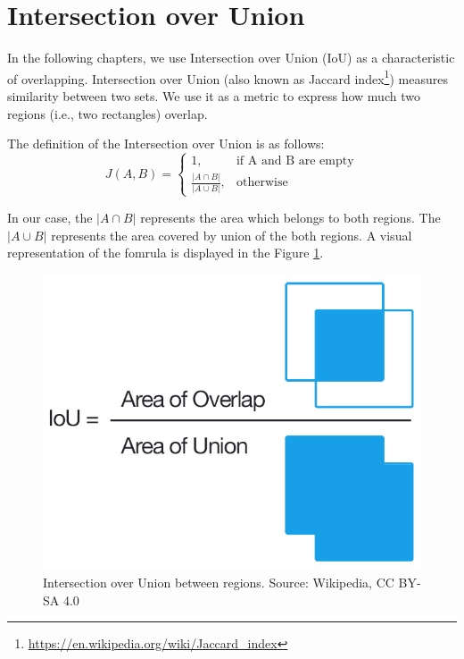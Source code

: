 \section{Intersection over Union}

In the following chapters, we use Intersection over Union (IoU) as a characteristic of overlapping. Intersection over Union (also known as Jaccard index\footnote{\href{https://en.wikipedia.org/wiki/Jaccard_index}{https://en.wikipedia.org/wiki/Jaccard\_index}}) measures similarity between two sets. We use it as a metric to express how much two regions (i.e., two rectangles) overlap. 

The definition of the Intersection over Union is as follows:
$$
    J(A, B) = 
    \begin{cases}
      1, & \text{if\ A and B are empty} \\
      \frac{|A \cap B|}{|A \cup B|}, & \text{otherwise}
    \end{cases}
$$

In our case, the $|A \cap B|$ represents the area which belongs to both regions. The  $|A \cup B|$ represents the area covered by union of the both regions. A visual representation of the fomrula is displayed in the Figure \ref{fig:intersection_over_union}.

\begin{figure}
    \centering
	\includegraphics[width=0.3\linewidth]{img/Intersection_over_Union_-_visual_equation.png}
	\caption{Intersection over Union between regions. Source: Wikipedia, CC BY-SA 4.0}
	\label{fig:intersection_over_union}
\end{figure}








